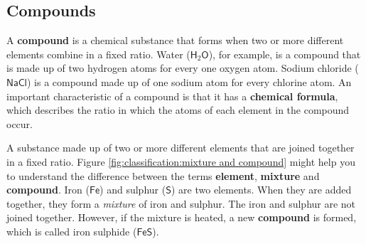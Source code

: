             \subsection*{Compounds}
            \nopagebreak
        \label{m38708*id63363}A \textbf{compound} is a chemical substance that forms when two or more different elements combine in a fixed ratio. Water ($\mathsf{H}{}_{2}\mathsf{O}$), for example, is a compound that is made up of two hydrogen atoms for every one oxygen atom. Sodium chloride ($\mathsf{NaCl}$) is a compound made up of one sodium atom for every chlorine atom. An important characteristic of a compound is that it has a \textbf{chemical formula}, which describes the ratio in which the atoms of each element in the compound occur.\par 
\label{m38708*fhsst!!!underscore!!!id201}
 { \label{m38708*meaningfhsst!!!underscore!!!id201}
        A substance made up of two or more different elements that are joined together in a fixed ratio.
         } 
        \label{m38708*id63410} Figure \ref{fig:classification:mixture and compound} might help you to understand the difference between the terms \textbf{element}, \textbf{mixture} and \textbf{compound}. Iron ($\mathsf{Fe}$) and sulphur ($\mathsf{S}$) are two elements. When they are added together, they form a \textsl{mixture} of iron and sulphur. The iron and sulphur are not joined together. However, if the mixture is heated, a new \textbf{compound} is formed, which is called iron sulphide ($\mathsf{FeS}$). \par 
